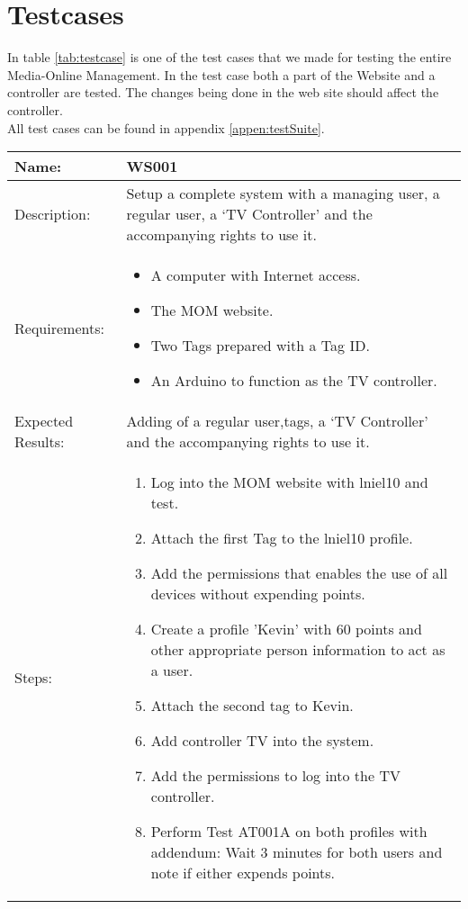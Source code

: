 \section{Testcases}
\label{sec:testcase}
In table \ref{tab:testcase} is one of the test cases that we made for testing the entire Media-Online Management. In the test case both a part of the Website and a controller are tested. The changes being done in the web site should affect the controller.\\ 
 All test cases can be found in appendix \vref{appen:testSuite}.
\begin{table}[h]
	\centering
		\begin{tabular*}{\textwidth}{|l|l|}
		\hline
		\hline
		Name: & WS001\\
		\hline
		Description: & \parbox{0.70\textwidth}{Setup a complete system with a managing user, a regular user, a `TV Controller' and the accompanying rights to use it.}\\
		\hline
		Requirements: & \parbox{0.70\textwidth}{
		\begin{itemize}
			\item A computer with Internet access.
			\item The MOM website.
			\item Two Tags prepared with a Tag ID.
			\item An Arduino to function as the TV controller. 
		\end{itemize}}
		\\
		\hline
		Expected Results: & \parbox{.70\textwidth}{Adding of a regular user,tags, a `TV Controller' and the accompanying rights to use it.}\\
		\hline
		Steps: & \parbox{.70\textwidth}{
		\begin{enumerate}
			\item Log into the MOM website with lniel10 and test.
			\item Attach the first Tag to the lniel10 profile.
			\item Add the permissions that enables the use of all devices without expending points.
			\item Create a profile 'Kevin' with 60 points and other appropriate person information to act as a user.
			\item Attach the second tag to Kevin.
			\item Add controller TV into the system.
			\item Add the permissions to log into the TV controller.
			\item Perform Test AT001A on both profiles with addendum: Wait 3 minutes for both users and note if either expends points.
		\end{enumerate}}
		\\		
		\hline
		\end{tabular*}
\end{table}



